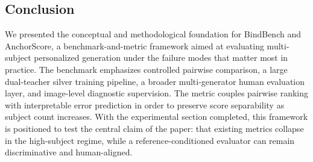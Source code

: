\subsection{Conclusion}
We presented the conceptual and methodological foundation for BindBench and AnchorScore, a benchmark-and-metric framework aimed at evaluating multi-subject personalized generation under the failure modes that matter most in practice. The benchmark emphasizes controlled pairwise comparison, a large dual-teacher silver training pipeline, a broader multi-generator human evaluation layer, and image-level diagnostic supervision. The metric couples pairwise ranking with interpretable error prediction in order to preserve score separability as subject count increases. With the experimental section completed, this framework is positioned to test the central claim of the paper: that existing metrics collapse in the high-subject regime, while a reference-conditioned evaluator can remain discriminative and human-aligned.
